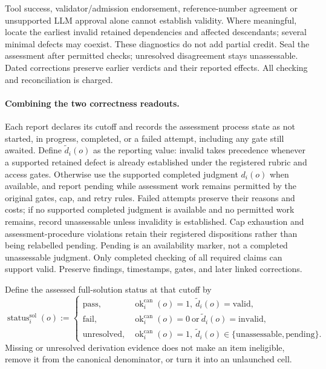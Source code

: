 \documentclass[10pt]{article} %
\providecommand{\1}{\mathbf{1}}  %
\theoremstyle{remark}
\theoremstyle{definition}
\begin{document}
Tool success, validator/admission endorsement, reference-number agreement
or unsupported LLM approval alone cannot establish validity. Where meaningful,
locate the earliest invalid retained dependencies and affected descendants;
several minimal defects may coexist. These diagnostics do not add partial
credit. Seal the assessment after permitted checks; unresolved disagreement
stays unassessable. Dated corrections preserve earlier verdicts and their
reported effects. All checking and reconciliation is charged.

\paragraph{Combining the two correctness readouts.}

Each report declares its cutoff and records the assessment process state
as not started, in progress, completed, or a failed attempt, including any
gate still awaited. Define $\widetilde d_i(o)$ as the reporting value:
invalid takes precedence whenever a supported retained defect is already
established under the registered rubric and access gates. Otherwise use
the supported completed judgment $d_i(o)$ when available, and report
pending while assessment work remains permitted by the original gates,
cap, and retry rules. Failed attempts preserve their reasons and costs;
if no supported completed judgment is available and no permitted work
remains, record unassessable unless invalidity is established. Cap
exhaustion and assessment-procedure violations retain
their registered dispositions rather than being relabelled pending.
Pending is an availability marker, not a completed unassessable judgment.
Only completed checking of all required claims can support valid.
Preserve findings, timestamps, gates, and later linked corrections.

Define the assessed full-solution status at that cutoff by
\begin{equation}
\operatorname{status}^{\mathrm{sol}}_i(o)
:=
\begin{cases}
\mathrm{pass},
&\operatorname{ok}^{\mathrm{can}}_i(o)=1,\
\widetilde d_i(o)=\mathrm{valid},\\
\mathrm{fail},
&\operatorname{ok}^{\mathrm{can}}_i(o)=0
\ \text{or}\ \widetilde d_i(o)=\mathrm{invalid},\\
\mathrm{unresolved},
&\operatorname{ok}^{\mathrm{can}}_i(o)=1,\
\widetilde d_i(o)\in\{\mathrm{unassessable},\mathrm{pending}\}.
\end{cases}
\label{eq:pilot-solution-status}
\end{equation}
Missing or unresolved derivation evidence does not make an item ineligible,
remove it from the canonical denominator, or turn it into an unlaunched cell.
\end{document}
